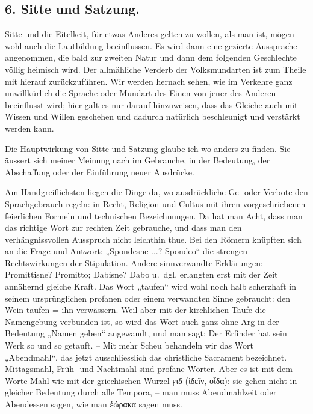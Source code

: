 {\label{sp.245} \label{fp.243}

\subsection*{6. Sitte und Satzung.}\label{III.II.II.12.6}
Sitte und die Eitelkeit, für etwas Anderes gelten zu wollen, als man ist, mögen wohl auch die Lautbildung beeinflussen. Es wird dann eine gezierte Aussprache angenommen, die bald zur zweiten Natur und dann dem folgenden Geschlechte völlig heimisch wird. Der allmähliche Verderb der Volksmundarten ist zum Theile mit hierauf zurückzuführen. Wir werden hernach sehen, wie im Verkehre ganz unwillkürlich die Sprache oder Mundart des Einen von jener des Anderen beeinflusst wird; hier galt es nur darauf hinzuweisen, dass das Gleiche auch mit Wissen und Willen geschehen und dadurch natürlich beschleunigt und verstärkt werden kann. 

\largerpage[1]Die Hauptwirkung von Sitte und Satzung glaube ich wo anders zu finden. Sie äussert sich meiner Meinung nach im Gebrauche, in der Bedeutung, der Abschaffung  oder der Einführung neuer Ausdrücke.

Am Handgreiflichsten liegen die Dinge da, wo ausdrückliche Ge- oder Verbote den Sprachgebrauch regeln: in Recht, Religion und Cultus mit ihren vorgeschriebenen feierlichen Formeln und technischen Bezeichnungen. Da hat man Acht, dass man das richtige Wort zur rechten Zeit gebrauche, und dass man den verhängnissvollen Ausspruch nicht leichthin thue. Bei den Römern knüpften sich an die Frage und Antwort: „Spondesne ...? Spondeo“ die strengen Rechtswirkungen der Stipulation. Andere sinnverwandte Erklärungen: Promittisne? Promitto; Dabisne? Dabo u.~dgl. erlangten erst mit der Zeit annähernd gleiche Kraft. Das Wort „taufen“ wird wohl noch halb scherzhaft in seinem ursprünglichen profanen oder einem verwandten Sinne gebraucht: den Wein taufen = ihn verwässern. Weil aber mit der kirchlichen Taufe die Namengebung verbunden ist, so wird das Wort auch ganz ohne Arg in der Bedeutung „Namen geben“ angewandt, und man sagt: Der Erfinder hat sein Werk so und so getauft. – Mit mehr Scheu behandeln wir das Wort „Abendmahl“, das jetzt ausschliesslich das christliche Sacrament bezeichnet. Mittagsmahl, Früh- und Nachtmahl sind profane Wörter. Aber es ist mit dem Worte Mahl wie mit der griechischen Wurzel ϝιδ (ἰδεῖν, οἶδα): sie gehen nicht in gleicher Bedeutung durch alle Tempora, – man muss Abendmahlzeit oder Abendessen sagen, wie man ἑώρακα sagen muss.

}
